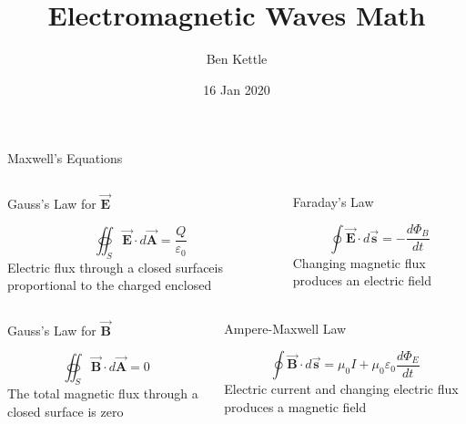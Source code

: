 \documentclass{beamer}
\title{Electromagnetic Waves Math}
\author{Ben Kettle}
\date{16 Jan 2020}
\begin{document}
 
\frame{\titlepage}

\begin{frame}{Maxwell's Equations}
    \begin{columns}
    \begin{column}{0.5\textwidth}
        \begin{center}
            Gauss's Law for $\vec{\mathbf{E}}$
        \end{center}
       \[ \oiint_S \vec{\mathbf{E}}\cdot d\vec{\mathbf{A}} = \frac{Q}{\varepsilon_0} \]
       Electric  flux  through  a  closed  surfaceis proportional to the charged enclosed
       \end{column}
       \begin{column}{0.5\textwidth}
        \begin{center}
            Faraday's Law
        \end{center}
        \[ \oint \vec{\mathbf{E}}\cdot d\vec{\mathbf{s}} = -\frac{d\Phi_B}{dt}\]
        Changing  magnetic  flux  produces  an  electric field 
    \end{column}
    \end{columns}
    
    \begin{columns}
    \begin{column}{0.5\textwidth}
        \begin{center}
            Gauss's Law for $\vec{\mathbf{B}}$
        \end{center}
       \[ \oiint_S \vec{\mathbf{B}}\cdot d\vec{\mathbf{A}} = 0 \]
       The   total   magnetic   flux   through   a closed surface is zero 
       \end{column}
       \begin{column}{0.5\textwidth}
        \begin{center}
            Ampere-Maxwell Law
        \end{center}
        \[ \oint \vec{\mathbf{B}}\cdot d\vec{\mathbf{s}} = \mu_0 I + \mu_0\varepsilon_0\frac{d\Phi_E}{dt}\]
        Electric  current  and  changing  electric  flux produces a magnetic field
    \end{column}
    \end{columns}
\end{frame}
\end{document}
